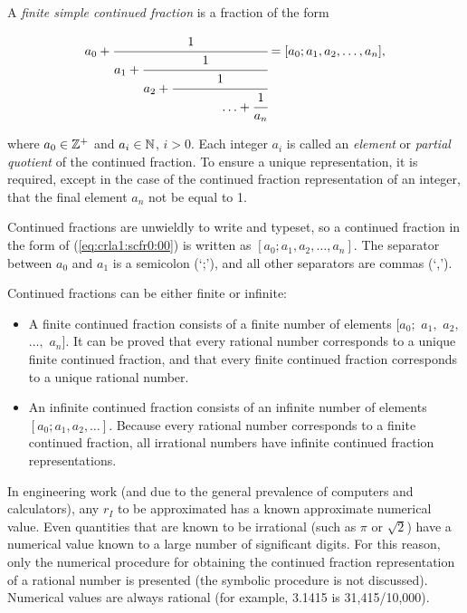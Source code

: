 A \emph{finite simple continued fraction} is a fraction of the form

\begin{equation}
\label{eq:crla1:scfr0:00}
a_0 + \cfrac{1}{a_1 + \cfrac{1}{a_2
    + \cfrac{1}{\;\;\;\;\;\;\;\;\;\;\;\;\;\;\ldots + \cfrac{1}{a_n}}}}
    =
    [a_0; a_1, a_2, \ldots , a_n] ,
\end{equation}

\noindent{}where $a_0 \in {\mathbb{Z}^+}$ and $a_i \in
{\mathbb{N}}$, $i > 0$.  Each integer $a_i$ is called an
\emph{element} or \emph{partial quotient} of the continued
fraction.  To ensure a unique representation, it is required, except in
the case of the continued fraction representation of an integer, that the
final element $a_n$ not be equal to 1.

Continued fractions are unwieldly to write and typeset, so a continued
fraction in the form of (\ref{eq:crla1:scfr0:00}) is written as
$[a_0; a_1, a_2, \ldots , a_n]$.  The separator between $a_0$ and $a_1$ is
a semicolon (`;'), and all other separators are commas (`,').

Continued fractions can be either finite or infinite:

\begin{itemize}
\item A finite continued fraction consists of a finite number of elements
      $[a_0;$ $a_1,$ $a_2,$ $\ldots ,$ $a_n]$\@.  It can be proved that every rational
      number corresponds to a unique finite continued fraction, and that
      every finite continued fraction corresponds to a unique rational number.
\item An infinite continued fraction consists of an infinite number of
      elements $[a_0; a_1, a_2, \ldots]$.  Because every rational number
      corresponds to a finite continued fraction, all irrational numbers have
      infinite continued fraction representations.
\end{itemize}

In engineering work (and due to the general prevalence of computers
and calculators), any $r_I$ to be approximated has a known approximate
numerical value.  Even quantities that are known to be irrational (such
as $\pi$ or $\sqrt{2}$) have a numerical value known to a large number
of significant digits.  For this reason, only the numerical procedure for
obtaining the continued fraction representation of a rational number is
presented (the symbolic procedure is not discussed).  Numerical values
are always rational (for example, 3.1415 is 31,415/10,000).

